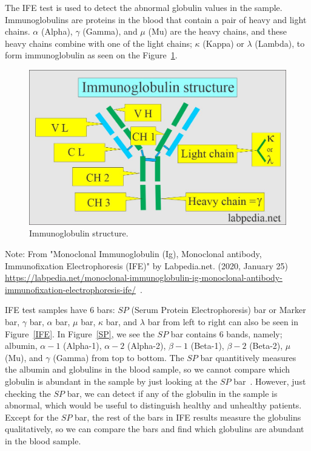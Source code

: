 The IFE test is used to detect the abnormal globulin values in the sample. Immunoglobulins are proteins in the blood that contain a pair of heavy and light chains. $\alpha$ (Alpha), $\gamma$ (Gamma), and $\mu$ (Mu) are the heavy chains, and these heavy chains combine with one of the light chains; $\kappa$ (Kappa) or $\lambda$ (Lambda), to form immunoglobulin as seen on the Figure~\ref{globulin}.

\begin{figure}[H]
\centering
\includegraphics[width=.99\textwidth]{images/old imgs/Immunoglobulin-structure.jpg}
\caption{Immunoglobulin structure.}
\label{globulin}
\end{figure}

\noindent Note: From "Monoclonal Immunoglobulin (Ig), Monoclonal antibody, Immunofixation Electrophoresis (IFE)" by Labpedia.net. (2020, January 25) \noindent\url{https://labpedia.net/monoclonal-immunoglobulin-ig-monoclonal-antibody-immunofixation-electrophoresis-ife/}~\cite{labpediaa}.
\vspace{10pt}

IFE test samples have 6 bars: $SP$ (Serum Protein Electrophoresis) bar or Marker bar, $\gamma$ bar, $\alpha$ bar, $\mu$ bar, $\kappa$ bar, and $\lambda$ bar from left to right can also be seen in Figure~\ref{IFE}. In Figure~\ref{SP}, we see the $SP$ bar contains 6 bands, namely; albumin, $\alpha-1$ (Alpha-1), $\alpha-2$ (Alpha-2), $\beta-1$ (Beta-1), $\beta-2$ (Beta-2), $\mu$ (Mu), and $\gamma$ (Gamma) from top to bottom. The $SP$ bar quantitively measures the albumin and globulins in the blood sample, so we cannot compare which globulin is abundant in the sample by just looking at the $SP$ bar~\cite{leung}. However, just checking the $SP$ bar, we can detect if any of the globulin in the sample is abnormal, which would be useful to distinguish healthy and unhealthy patients. Except for the $SP$ bar, the rest of the bars in IFE results measure the globulins qualitatively, so we can compare the bars and find which globulins are abundant in the blood sample.

